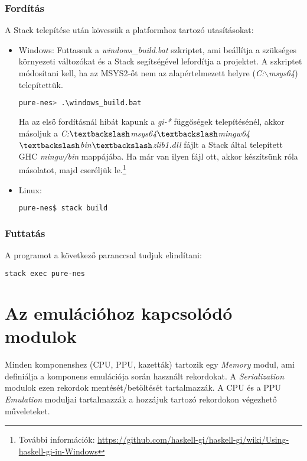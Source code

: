 \subsubsection{Fordítás}
A Stack telepítése után kövessük a platformhoz tartozó utasításokat:
\begin{itemize}
	\item Windows: Futtassuk a \emph{windows\_build.bat} szkriptet, ami beállítja a szükséges környezeti változókat és a Stack segítségével lefordítja a projektet. A szkriptet módosítani kell, ha az MSYS2-őt nem az alapértelmezett helyre (\emph{C:$\backslash$msys64}) telepítettük.
\begin{lstlisting}[language=bash]
pure-nes> .\windows_build.bat
\end{lstlisting}
	Ha az első fordításnál hibát kapunk a \emph{gi-*} függőségek telepítésénél, akkor másoljuk a 
	\emph{C:$\textbackslash$msys64$\textbackslash$mingw64$\textbackslash$bin$\textbackslash$zlib1.dll} fájlt a Stack által telepített GHC \emph{mingw/bin} mappájába. Ha már van ilyen fájl ott, akkor készítsünk róla másolatot, majd cseréljük le.\footnote{További információk: \url{https://github.com/haskell-gi/haskell-gi/wiki/Using-haskell-gi-in-Windows}}

	\item Linux:
\begin{lstlisting}[language=bash]
pure-nes$ stack build
\end{lstlisting}
\end{itemize}

\clearpage
\subsubsection{Futtatás}
A programot a következő paranccsal tudjuk elindítani:
\begin{lstlisting}[language=bash]
stack exec pure-nes
\end{lstlisting}

\section{Az emulációhoz kapcsolódó modulok}

Minden komponenshez (CPU, PPU, kazetták) tartozik egy \emph{Memory} modul, ami definiálja a komponens emulációja során használt rekordokat. A \emph{Serialization} modulok ezen rekordok mentését/betöltését tartalmazzák. A CPU és a PPU \emph{Emulation} moduljai tartalmazzák a hozzájuk tartozó rekordokon végezhető műveleteket.

